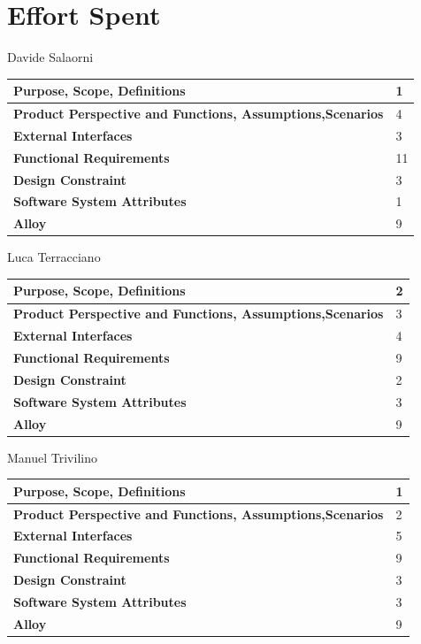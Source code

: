 \documentclass[a4paper]{article}
\begin{document}
\clearpage
    
\section{Effort Spent}

Davide Salaorni

\begin{center}
\begin{tabular}{|l | l |}
    \hline \bf{Purpose, Scope, Definitions} & 1 \\ \hline
    \bf{Product Perspective and Functions, Assumptions,Scenarios}  & 4 \\ \hline
    \bf{External Interfaces} & 3 \\ \hline
    \bf{Functional Requirements} & 11 \\ \hline
    \bf{Design Constraint} & 3\\ \hline
    \bf{Software System Attributes} & 1 \\ \hline
    \bf{Alloy} & 9 \\ \hline
\end{tabular}
\end{center}

\noindent  Luca Terracciano

    \begin{center}
\begin{tabular}{|l | l |}
    \hline \bf{Purpose, Scope, Definitions} & 2 \\ \hline
    \bf{Product Perspective and Functions, Assumptions,Scenarios}  & 3 \\ \hline
    \bf{External Interfaces} & 4 \\ \hline
    \bf{Functional Requirements} & 9 \\ \hline
    \bf{Design Constraint} & 2\\ \hline
    \bf{Software System Attributes} & 3 \\ \hline
    \bf{Alloy} & 9 \\ \hline
\end{tabular}
\end{center}

\noindent Manuel Trivilino

    \begin{center}
\begin{tabular}{|l | l |}
    \hline \bf{Purpose, Scope, Definitions} & 1 \\ \hline
    \bf{Product Perspective and Functions, Assumptions,Scenarios}  & 2 \\ \hline
    \bf{External Interfaces} & 5 \\ \hline
    \bf{Functional Requirements} & 9 \\ \hline
    \bf{Design Constraint} & 3 \\ \hline
    \bf{Software System Attributes} & 3 \\ \hline
    \bf{Alloy} & 9 \\ \hline
\end{tabular}
\end{center}
\end{document}
